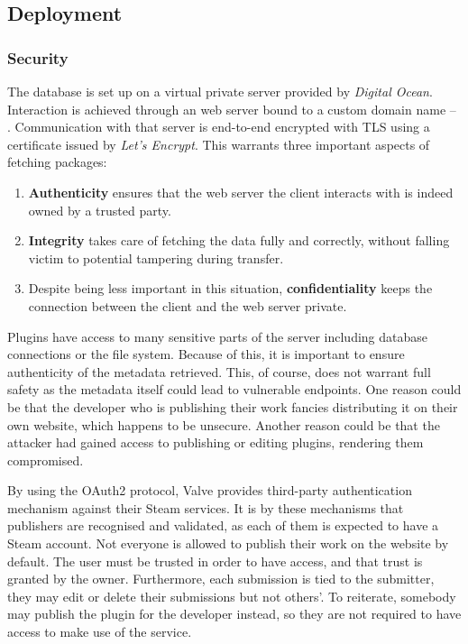 \subsection{Deployment}

\subsubsection{Security}

The database is set up on a virtual private server provided by \textit{Digital Ocean}.
Interaction is achieved through an web server bound to a custom domain name -- .
Communication with that server is end-to-end encrypted with TLS using a certificate issued by \textit{Let's Encrypt}.
This warrants three important aspects of fetching packages:
\begin{enumerate}
\item \textbf{Authenticity} ensures that the web server the client interacts with is indeed owned by a trusted party.
\item \textbf{Integrity} takes care of fetching the data fully and correctly, without falling victim to potential tampering during transfer.
\item Despite being less important in this situation, \textbf{confidentiality} keeps the connection between the client and the web server private.
\end{enumerate}

Plugins have access to many sensitive parts of the server including database connections or the file system.
Because of this, it is important to ensure authenticity of the metadata retrieved.
This, of course, does not warrant full safety as the metadata itself could lead to vulnerable endpoints.
One reason could be that the developer who is publishing their work fancies distributing it on their own website, which happens to be unsecure.
Another reason could be that the attacker had gained access to publishing or editing plugins, rendering them compromised.

By using the OAuth2 protocol, Valve provides third-party authentication mechanism against their Steam services.
It is by these mechanisms that publishers are recognised and validated, as each of them is expected to have a Steam account.
Not everyone is allowed to publish their work on the website by default.
The user must be trusted in order to have access, and that trust is granted by the owner.
Furthermore, each submission is tied to the submitter, they may edit or delete their submissions but not others'.
To reiterate, somebody may publish the plugin for the developer instead, so they are not required to have access to make use of the service.

